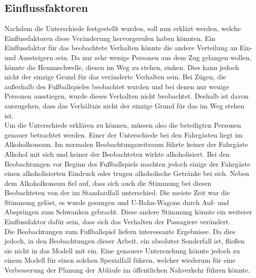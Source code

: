 \subsection{Einflussfaktoren}
Nachdem die Unterschiede festgestellt wurden, soll nun erklärt werden, welche Einflussfaktoren diese Veränderung hervorgerufen haben könnten.
Ein Einflussfaktor für das beobachtete Verhalten könnte die andere Verteilung an Ein- und Aussteigern sein. Da nur sehr wenige Personen aus dem Zug gelangen wollen, könnte die Hemmschwelle, diesen im Weg zu stehen, sinken. Dies kann jedoch nicht der einzige Grund für das veränderte Verhalten sein. Bei Zügen, die außerhalb des Fußballspieles beobachtet wurden und bei denen nur wenige Personen ausstiegen, wurde dieses Verhalten nicht beobachtet. Deshalb ist davon auszugehen, dass das Verhältnis nicht der einzige Grund für das im Weg stehen ist.\\
Um die Unterschiede erklären zu können, müssen also die beteiligten Personen genauer betrachtet werden. Einer der Unterschiede bei den Fahrgästen liegt im Alkoholkonsum. Im normalen Beobachtungszeitraum führte keiner der Fahrgäste Alkohol mit sich und keiner der Beobachteten wirkte alkoholisiert. Bei den Beobachtungen vor Beginn des Fußballspiels machten jedoch einige der Fahrgäste einen alkoholisierten Eindruck oder trugen alkoholische Getränke bei sich. Neben dem Alkoholkonsum fiel auf, dass sich auch die Stimmung bei diesen Beobachteten von der im Standardfall unterschied. Die meiste Zeit war die Stimmung gelöst, es wurde gesungen und U-Bahn-Wagons durch Auf- und Abspringen zum Schwanken gebracht. Diese andere Stimmung könnte ein weiterer Einflussfaktor dafür sein, dass sich das Verhalten der Passagiere verändert. \\
Die Beobachtungen zum Fußballspiel liefern interessante Ergebnisse. Da dies jedoch, in den Beobachtungen dieser Arbeit, ein absoluter Sonderfall ist, fließen sie nicht in das Modell mit ein. Eine genauere Untersuchung könnte jedoch zu einem Modell für einen solchen Spezialfall führen, welcher wiederum für eine Verbesserung der Planung der Abläufe im öffentlichen Nahverkehr führen könnte.